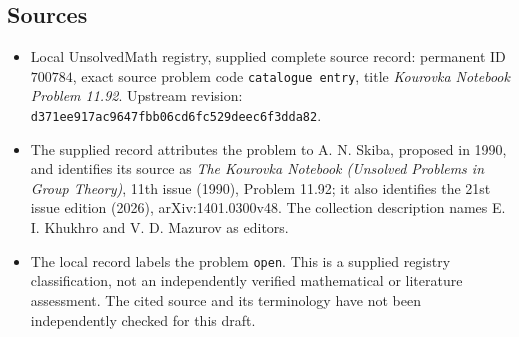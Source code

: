 \documentclass[11pt]{article}
\begin{document}
\subsection{Sources}
\begin{itemize}
\item Local UnsolvedMath registry, supplied complete source record: permanent ID \(700784\), exact source problem code \texttt{catalogue entry}, title \emph{Kourovka Notebook Problem 11.92}. Upstream revision: \texttt{d371ee917ac9647fbb06cd6fc529deec6f3dda82}.
\item The supplied record attributes the problem to A. N. Skiba, proposed in 1990, and identifies its source as \emph{The Kourovka Notebook (Unsolved Problems in Group Theory)}, 11th issue (1990), Problem 11.92; it also identifies the 21st issue edition (2026), arXiv:1401.0300v48. The collection description names E. I. Khukhro and V. D. Mazurov as editors.
\item The local record labels the problem \texttt{open}. This is a supplied registry classification, not an independently verified mathematical or literature assessment. The cited source and its terminology have not been independently checked for this draft.
\end{itemize}
\end{document}
